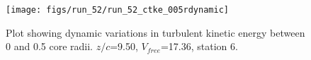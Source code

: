 \begin{figure}[H]
\centering
\texttt{[image: figs/run\_52/run\_52\_ctke\_005rdynamic]}
\caption{Plot showing dynamic variations in turbulent kinetic energy between 0 and 0.5 core radii. $z/c$=9.50, $V_{free}$=17.36, station 6.}
\end{figure}


